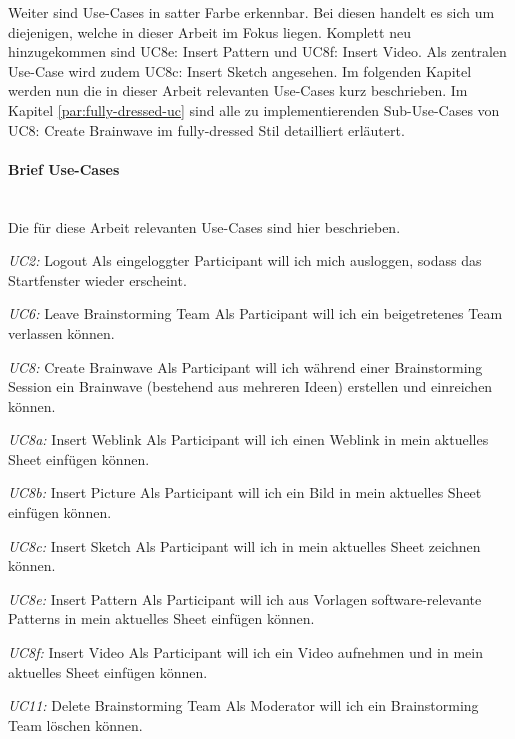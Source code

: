 Weiter sind Use-Cases in satter Farbe erkennbar. Bei diesen handelt es sich um diejenigen, welche in dieser Arbeit im Fokus liegen. Komplett neu hinzugekommen sind UC8e: Insert Pattern und UC8f: Insert Video. Als zentralen Use-Case wird zudem UC8c: Insert Sketch angesehen. Im folgenden Kapitel werden nun die in dieser Arbeit relevanten Use-Cases kurz beschrieben. Im Kapitel \ref{par:fully-dressed-uc} sind alle zu implementierenden Sub-Use-Cases von UC8: Create Brainwave im fully-dressed Stil detailliert erläutert.
\paragraph{Brief Use-Cases}~\\
Die für diese Arbeit relevanten Use-Cases sind hier beschrieben.

\begin{basedescript}{
		\desclabelstyle{\multilinelabel}
		\desclabelwidth{4.5cm}
		\setlength{\itemsep}{5ex}}
	
	\item[\textit{UC2: }Logout] Als eingeloggter Participant will ich mich ausloggen, sodass das Startfenster wieder erscheint.
	
	\item[\textit{UC6: }Leave Brainstorming Team] Als Participant will ich ein beigetretenes Team verlassen können.
		
	\item[\textit{UC8: }Create Brainwave] Als Participant will ich während einer Brainstorming Session ein Brainwave (bestehend aus mehreren Ideen) erstellen und einreichen können. 
	
	\item[\textit{UC8a: }Insert Weblink] Als Participant will ich einen Weblink in mein aktuelles Sheet einfügen können.
	
	\item[\textit{UC8b: }Insert Picture] Als Participant will ich ein Bild in mein aktuelles Sheet einfügen können.
	
	\item[\textit{UC8c: }Insert Sketch] Als Participant will ich in mein aktuelles Sheet zeichnen können.
	
	\item[\textit{UC8e: }Insert Pattern] Als Participant will ich aus Vorlagen software-relevante Patterns in mein aktuelles Sheet einfügen können.
	
	\item[\textit{UC8f: }Insert Video] Als Participant will ich ein Video aufnehmen und in mein aktuelles Sheet einfügen können.
	
	\item[\textit{UC11: }Delete Brainstorming Team] Als Moderator will ich ein Brainstorming Team löschen können.
\end{basedescript}
\vspace{1cm}

